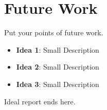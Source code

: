 \section{Future Work}

Put your points of future work. 

\begin{itemize}
    \item \textbf{Idea 1}: Small Description
    \item \textbf{Idea 2}: Small Description
    \item \textbf{Idea 3}: Small Description
\end{itemize}

Ideal report ends here. 